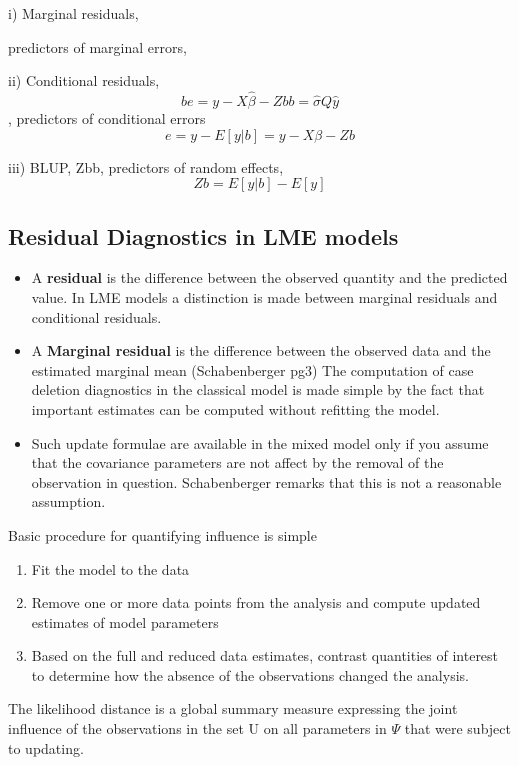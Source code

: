 \documentclass[Main.tex]{subfiles}
\begin{document}
i) Marginal residuals, 

predictors of marginal errors, 


ii) Conditional residuals, 
\[be = y − X\hat{\beta} − Zbb = \hat{\sigma}Q\hat{y}\] , predictors of
conditional errors 
\[e = y − E[y|b] = y − X\beta − Zb\]

iii) BLUP, Zbb, predictors of random effects,
\[ Zb = E[y|b] − E[y]\]


	\subsection{Residual Diagnostics in LME models}
	\begin{itemize}
		\item A \textbf{residual} is the difference between the observed quantity and the predicted value. In LME models a distinction is made between marginal residuals and conditional residuals.
		
		\item A \textbf{Marginal residual} is the difference between the observed data and the estimated marginal mean (Schabenberger  pg3)
		The computation of case deletion diagnostics in the classical model is made simple by the fact that important estimates can be computed without refitting the model. 
		
		\item Such update formulae are available in the mixed model only if you assume that the covariance parameters are not affect by the removal of the observation in question. Schabenberger remarks that this is not a reasonable assumption.
		
	\end{itemize}
	
	
	Basic procedure for quantifying influence is simple
	
	\begin{enumerate}
		\item  	Fit the model to the data
		\item   	Remove one or more data points from the analysis and compute updated estimates of model parameters
		\item  	Based on the full and reduced data estimates, contrast quantities of interest to determine how the absence of the observations changed the analysis.
	\end{enumerate}
	The likelihood distance is a global summary measure expressing the joint influence of the observations in the set U on all parameters in $\Psi$ that were subject to updating.
	
\end{document}
